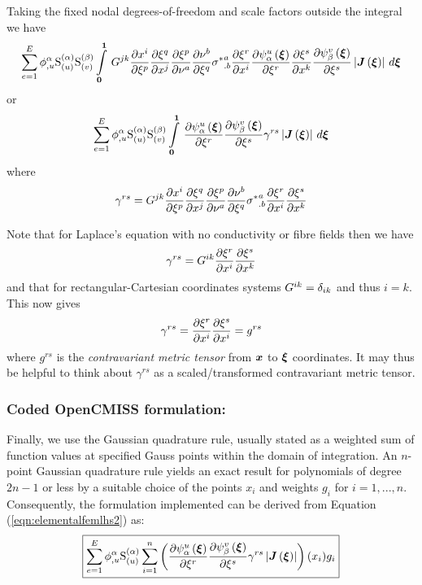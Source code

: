 Taking the fixed nodal degrees-of-freedom and scale factors outside the integral we have
\begin{equation}
  \dsum_{e=1}^{E}\nodedof{\phi}{\alpha}{u}\gsf{(\alpha)}{(u)}\gsf{(\beta)}{(v)}
  \gint{\vect{0}}{\vect{1}}{G^{jk}\delby{x^{i}}{\xi^{p}}
    \delby{\xi^{q}}{x^{j}}\delby{\xi^{p}} {\nu^{a}}
    \delby{\nu^{b}}{\xi^{q}}{\sigma^{*}}^{a}_{.b}\delby{\xi^{r}}{x^{i}}
    \delby{\gbfn{\alpha}{u}{\vect{\xi}}}{\xi^{r}}
    \delby{\xi^{s}}{x^{k}}\delby{\gbfn{\beta}{v}{\vect{\xi}}}{\xi^{s}}
    \abs{\fnof{\matr{J}}{\vect{\xi}}}}{\vect{\xi}}
  \label{eqn:elementalfemlhs1}
\end{equation}
or
\begin{equation}
  \dsum_{e=1}^{E}\nodedof{\phi}{\alpha}{u}\gsf{(\alpha)}{(u)}\gsf{(\beta)}{(v)}
  \gint{\vect{0}}{\vect{1}}{\delby{\gbfn{\alpha}{u}{\vect{\xi}}}{\xi^{r}}\delby{\gbfn{\beta}{v}{\vect{\xi}}}{\xi^{s}}\gamma^{rs}
    \abs{\fnof{\matr{J}}{\vect{\xi}}}}{\vect{\xi}}
  \label{eqn:elementalfemlhs2}
\end{equation}
where
\begin{equation}
  \gamma^{rs}=G^{jk} \dfrac{\partial x^{i}}{\partial \xi^{p}} 
     \dfrac{\partial \xi^{q}}{\partial x^{j}}  \dfrac{\partial \xi^{p}}{\partial \nu^{a}} 
     \dfrac{\partial \nu^{b}}{\partial \xi^{q}} {\sigma^{*}}^{a}_{.b} \dfrac{\partial \xi^{r}}{\partial x^{i}}  \dfrac{\partial \xi^{s}}{\partial x^{k}} 
\end{equation}

Note that for Laplace's equation with no conductivity or fibre fields then we have
\begin{equation}
  \gamma^{rs}=G^{ik} \dfrac{\partial \xi^{r}}{\partial x^{i}}  \dfrac{\partial \xi^{s}}{\partial x^{k}} 
\end{equation}
and that for rectangular-Cartesian coordinates systems
$G^{ik}=\delta_{{i}{k}}$ and thus $i=k$. This now gives
\begin{equation}
  \gamma^{rs}= \dfrac{\partial \xi^{r}}{\partial x^{i}}  \dfrac{\partial \xi^{s}}{\partial x^{i}} =g^{rs}
  \label{eqn:contrametrictensor}
\end{equation}
where $g^{rs}$ is the \emph{contravariant metric tensor} from $\vect{x}$ to
$\vect{\xi}$ coordinates. It may thus be helpful to think about $\gamma^{rs}$
as a scaled/transformed contravariant metric tensor.

\subsubsection{Coded OpenCMISS formulation:}
Finally, we use the Gaussian quadrature rule, usually stated as a weighted sum of function values at specified Gauss points within the domain of integration. An $n$-point Gaussian quadrature rule yields an exact result for polynomials of degree $2n-1$ or less by a suitable choice of the points $x_i$ and weights $g_i$ for $i = 1,...,n$. Consequently, the formulation implemented can be derived from Equation (\ref{eqn:elementalfemlhs2}) as: 
\begin{equation}
  \boxed{
  \dsum_{e=1}^{E}\nodedof{\phi}{\alpha}{u}\gsf{(\alpha)}{(u)}
  \dsum_{i=1}^{n}
  \left(\delby{\gbfn{\alpha}{u}{\vect{\xi}}}{\xi^{r}}
  \delby{\gbfn{\beta}{v}{\vect{\xi}}}{\xi^{s}}\gamma^{rs}\abs{\fnof{\matr{J}}{\vect{\xi}}}
  \right)(x_i)g_i
  }
\end{equation}
